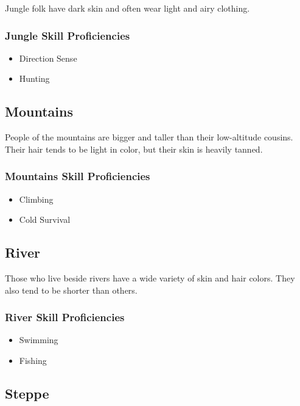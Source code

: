 \begin{multicols}{2}
Jungle folk have dark skin and often wear light and airy clothing.

\subsubsection{Jungle Skill Proficiencies}

\begin{itemize}
  \item Direction Sense
  \item Hunting
\end{itemize}

\subsection{Mountains}

People of the mountains are bigger and taller than their low-altitude
cousins. Their hair tends to be light in color, but their skin is heavily
tanned.

\subsubsection{Mountains Skill Proficiencies}

\begin{itemize}
  \item Climbing
  \item Cold Survival
\end{itemize}

\subsection{River}

Those who live beside rivers have a wide variety of skin and hair colors.
They also tend to be shorter than others.

\subsubsection{River Skill Proficiencies}

\begin{itemize}
  \item Swimming
  \item Fishing
\end{itemize}

\subsection{Steppe}


\end{multicols}
